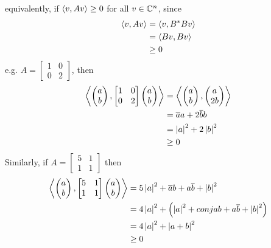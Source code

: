 \begin{enumerate}[label=\arabic*.]
          equivalently, if $\left\langle v, Av\right\rangle \geq 0$ for all $v\in\mathbb{C}^n$, since
          \begin{align*}\left\langle v, Av\right\rangle
               & = \left\langle v, B^*Bv\right\rangle \\
               & = \left\langle Bv, Bv\right\rangle   \\
               & \geq 0
          \end{align*}
          e.g. $A = \begin{bmatrix}1&0\\0&2\end{bmatrix}$, then
          \begin{align*}\left\langle \begin{pmatrix}a\\b\end{pmatrix}, \begin{bmatrix}1&0\\0&2\end{bmatrix}\begin{pmatrix}a\\b\end{pmatrix}\right\rangle
               & =\left\langle \begin{pmatrix}a\\b\end{pmatrix}, \begin{pmatrix}a\\2b\end{pmatrix}\right\rangle \\
               & = \overline{a}a + 2\overline{b}b                                               \\
               & = \left\lvert a\right\rvert^2 + 2\left\lvert b\right\rvert^2                                               \\
               & \geq 0
          \end{align*}
          Similarly, if $A = \begin{bmatrix}5&1\\1&1\end{bmatrix}$ then
          \begin{align*}\left\langle \begin{pmatrix}a\\b\end{pmatrix}, \begin{bmatrix}5&1\\1&1\end{bmatrix}\begin{pmatrix}a\\b\end{pmatrix}\right\rangle
               & = 5\left\lvert a\right\rvert^2 + \overline{a}b + a\overline{b} + \left\lvert b\right\rvert^2                         \\
               & = 4\left\lvert a\right\rvert^2 + \left(\left\lvert a\right\rvert^2 + conj{a}b + a\overline{b} + \left\lvert b\right\rvert^2\right) \\
               & = 4\left\lvert a\right\rvert^2 + \left\lvert a + b\right\rvert^2                                             \\
               & \geq 0
          \end{align*}


\end{enumerate}
